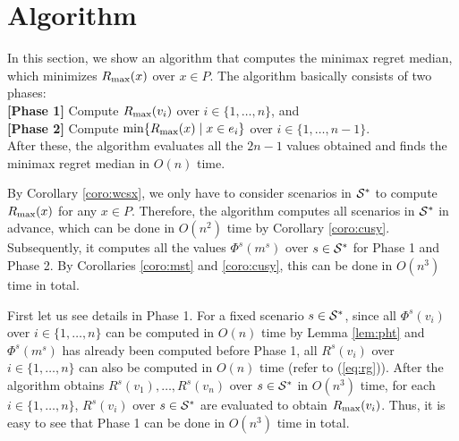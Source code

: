 \documentclass[a4paper]{llncs}
\begin{document}
\section{Algorithm}
\label{sec:al}
In this section, we show an algorithm that computes the minimax regret median, which minimizes $R_{\rm max}(x)$ over $x \in P$.
The algorithm basically consists of two phases: \\
{\bf [Phase 1]} Compute $R_{\rm max}(v_i)$ over $i \in \{1, \ldots, n\}$, and \\
{\bf [Phase 2]} Compute $\min \{R_{\rm max}(x) \mid x \in e_i\}$ over $i \in \{1, \ldots, n-1\}$. \\
After these, the algorithm evaluates all the $2n-1$ values obtained and finds the minimax regret median in $O(n)$ time.

By Corollary \ref{coro:wcsx}, we only have to consider scenarios in ${\cal S}^*$ to compute $R_{\rm max}(x)$ for any $x \in P$.
Therefore, the algorithm computes all scenarios in ${\cal S}^*$ in advance, which can be done in $O(n^2)$ time by Corollary \ref{coro:cusy}.
Subsequently, it computes all the values $\Phi^s(m^s)$ over $s \in {\cal S}^*$ for Phase 1 and Phase 2.
By Corollaries \ref{coro:mst} and \ref{coro:cusy}, this can be done in $O(n^3)$ time in total.  

First let us see details in Phase 1. 
For a fixed scenario $s \in {\cal S}^*$,
since all $\Phi^s(v_i)$ over $i \in \{1, \ldots, n\}$ can be computed in $O(n)$ time by Lemma \ref{lem:pht}
and $\Phi^s(m^s)$ has already been computed before Phase 1,
all $R^s(v_i)$ over $i \in \{1, \ldots, n\}$ can also be computed in $O(n)$ time (refer to (\ref{eq:rg})).
After the algorithm obtains $R^s(v_1), \ldots, R^s(v_n)$ over $s \in {\cal S}^*$ in $O(n^3)$ time,
for each $i \in \{1, \ldots, n\}$,
$R^s(v_i)$ over $s \in {\cal S}^*$ are evaluated to obtain $R_{\rm max}(v_i)$.
Thus, it is easy to see that Phase 1 can be done in $O(n^3)$ time in total.
\end{document}
